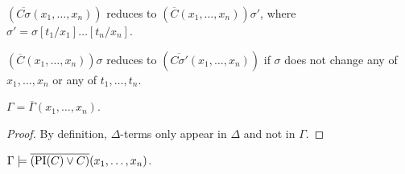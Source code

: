 	\begin{lemma}
		\label{lemma:overline}
		$(\overline{C\sigma}(x_1, \ldots, x_n))$ reduces to
		$(\overline{C}(x_1, \ldots, x_n))\sigma'$, where $\sigma' = \sigma[t_1 / x_1]\ldots[t_n / x_n]$.

		$(\overline{C}(x_1, \ldots, x_n))\sigma$ reduces to
		$(\overline{C\sigma'}(x_1, \ldots, x_n))$ if $\sigma$ does not change any of $x_1, \ldots, x_n$ or any of $t_1, \ldots, t_n$.\qedhere

		
	\end{lemma}

	\begin{prop}
		$\Gamma = \overline{\Gamma}(x_1, \ldots, x_n)$.
	\end{prop}
	\begin{proof}
		By definition, $\Delta$-terms only appear in $\Delta$ and not in $\Gamma$. 
	\end{proof}

	\begin{lemma} $ \Gamma \models \overline{(\mathrm{PI}(C) \lor C)}(x_1, \ldots, x_n) $.
		\label{lemma:gamma_entails_interpolant}
	\end{lemma}

